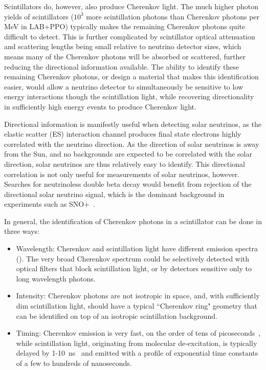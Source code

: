 Scintillators do, however, also produce Cherenkov light. 
The much higher photon yields of scintillators ($10^3$ more scintillation photons than Cherenkov photons per MeV in LAB+PPO) typically makes the remaining Cherenkov photons quite difficult to detect.
This is further complicated by scintillator optical attenuation and scattering lengths being small relative to neutrino detector sizes, which means many of the Cherenkov photons will be absorbed or scattered, further reducing the directional information available.
The ability to identify these remaining Cherenkov photons, or design a material that makes this identification easier, would allow a neutrino detector to simultaneously be sensitive to low energy interactions though the scintillation light, while recovering directionality in sufficiently high energy events to produce Cherenkov light.

Directional information is manifestly useful when detecting solar neutrinos, as the elastic scatter (ES) interaction channel produces final state electrons highly correlated with the neutrino direction. 
As the direction of solar neutrinos is away from the Sun, and no backgrounds are expected to be correlated with the solar direction, solar neutrinos are thus relatively easy to identify. 
This directional correlation is not only useful for measurements of solar neutrinos, however. Searches for neutrinoless double beta decay would benefit from rejection of the directional solar neutrino signal, which is the dominant background in experiments such as SNO+~\cite{snop}.

In general, the identification of Cherenkov photons in a scintillator can be done in three ways:
\begin{itemize}
    \item Wavelength:  Cherenkov and scintillation light have different emission spectra (). The very broad Cherenkov spectrum could be selectively detected with optical filters that block scintillation light, or by detectors sensitive only to long wavelength photons.
	\item Intensity: Cherenkov photons are not isotropic in space, and, with sufficiently dim scintillation light, should have a typical ``Cherenkov ring" geometry that can be identified on top of an isotropic scintillation background.
	\item Timing: Cherenkov emission is very fast, on the order of tens of picoseconds~\cite{cherenkov}, while scintillation light, originating from molecular de-excitation, is typically delayed by 1-10~ns~\cite{birks} and emitted with a profile of exponential time constants of a few to hundreds of nanoseconds.
\end{itemize}

